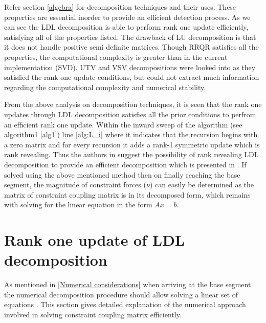 Refer section \ref{algebra} for decomposition techniques and their uses.
These properties are essential inorder to provide an efficient detection process. As we can see the LDL decomposition is able to perform rank one update efficiently, satisfying all of the properties listed. The drawback of LU decomposition is that it does not handle positive semi definite matrices. Though RRQR satisfies all the properties, the computational complexity is greater than in the current implementation (SVD). UTV and VSV decompositions were looked into as they satisfied the rank one update conditions, but could not extract much information regarding the computational complexity and numerical stability.

From the above analysis on decomposition techniques, it is seen that the rank one updates through LDL decomposition satisfies all the prior conditions to perfrom an efficient rank one update.  Within the inward sweep of the algorithm (see algorithm1 \ref{alg1}) line \ref{alg:L_i} where it indicates that the recursion begins with a zero matrix and for every recursion it adds a rank-1 symmetric update which is rank revealing. Thus the authors in \cite{shakhimardanov2015composable} suggest the possibility of rank revealing LDL decomposition to provide an efficient decomposition which is presented in \cite{sentana1999econometric}. If solved using the above mentioned method then on finally reaching the base segment, the magnitude of constraint forces ($\nu$) can easily be determined as the matrix of constraint coupling matrix is in its decomposed form, which remains with solving for the linear equation in the form $Ax = b$.

\section{Rank one update of LDL decomposition}
As mentioned in \ref{Numerical considerations} when arriving at the base segment the numerical decomposition procedure should allow solving a linear set of equations \cite{shakhimardanov2015composable}. This section gives detailed explanation of the numerical approach involved in solving constraint coupling matrix efficiently.



